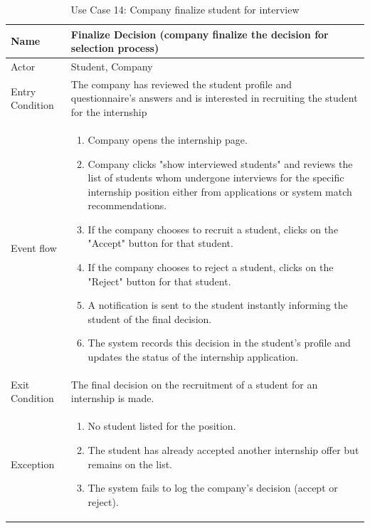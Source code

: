 \begin{table}[H]
    \centering
    \begin{tabular}{|l|p{12cm}|}
    \hline
    Name             & Finalize Decision (company finalize the decision for selection process) \\ \hline
    Actor            & Student, Company \\ \hline
    Entry Condition  & 
    The company has reviewed the student profile and questionnaire's answers and is interested in recruiting the student for the internship\\ \hline
    Event flow       & 
    \begin{enumerate}
        \item Company opens the internship page. 
        \item Company clicks "show interviewed students" and reviews the list of students whom undergone interviews for the specific internship position either from applications or system match recommendations.
        \item If the company chooses to recruit a student, clicks on the "Accept" button for that student.
        \item If the company chooses to reject a student, clicks on the "Reject" button for that student.
        \item A notification is sent to the student instantly informing the student of the final decision.
        \item The system records this decision in the student's profile and updates the status of the internship application.
    \end{enumerate} \\ \hline
    Exit Condition   & The final decision on the recruitment of a student for an internship is made. \\ \hline
    Exception        & 
    \begin{enumerate}
        \item No student listed for the position.
        \item The student has already accepted another internship offer but remains on the list.
        \item The system fails to log the company's decision (accept or reject).
\end{enumerate} \\ \hline
\end{tabular}
\caption{Use Case 14: Company finalize student for interview}
\label{tab:user_signup}
\end{table}


